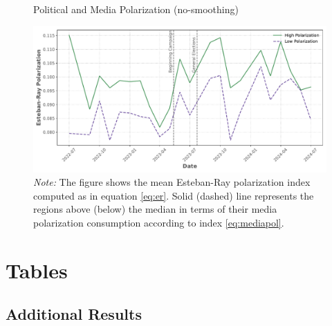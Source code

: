 \documentclass[12pt]{article}
\begin{document}
	\begin{figure}[ht!]
		\centering
		\caption{Political and Media Polarization (no-smoothing)}
		\includegraphics[width=150mm]{figures/er_polarization_stata_group_raw}
		\caption*{\textit{Note:} \small The figure shows the mean Esteban-Ray polarization index  computed as in equation \ref{eq:er}.  Solid (dashed) line represents the regions above (below) the median in terms of their media polarization consumption according to index \ref{eq:mediapol}.   }
		\label{fig:er}
	\end{figure}
	
	
	\clearpage

\section{Tables}
	
	\subsection{Additional Results}
	
	
	
\end{document}
